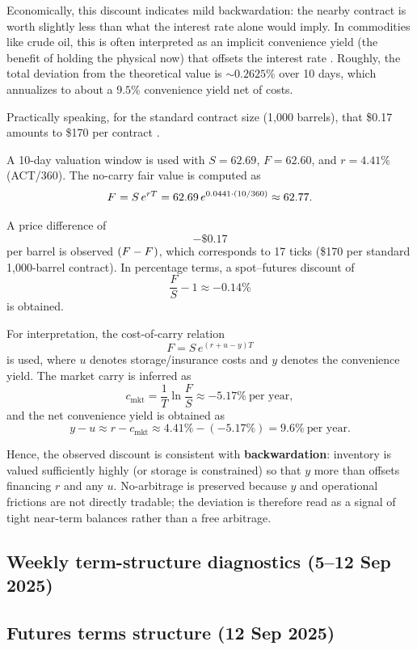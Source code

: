 \documentclass[11pt,a4paper]{article} %
\begin{document}
Economically, this discount indicates mild backwardation: the nearby contract is worth slightly less than what the interest rate alone would imply. In commodities like crude oil, this is often interpreted as an implicit convenience yield (the benefit of holding the physical now) that offsets the interest rate \citep{kaldor_working_brennan, eia_backwardation_2013, milonas_convenience_2024}. Roughly, the total deviation from the theoretical value is $\sim 0.2625\%$ over 10 days, which annualizes to about a $9.5\%$ convenience yield net of costs.

Practically speaking, for the standard contract size (1{,}000 barrels), that \$0.17 amounts to \$170 per contract \citep{cme_cl_specs}.


A 10-day valuation window is used with $S=62.69$, $F=62.60$, and $r=4.41\%$ (ACT/360). The no-carry fair value is computed as
\[
F^{\*}=S\,e^{rT}=62.69\,e^{0.0441\cdot(10/360)}\approx62.77.
\]

A price difference of
\[
-\$0.17
\]
per barrel is observed $(F-F^{\*})$, which corresponds to 17 ticks (\$170 per standard 1,000-barrel contract). In percentage terms, a spot–futures discount of
\[
\frac{F}{S}-1 \approx -0.14\%
\]
is obtained.

For interpretation, the cost-of-carry relation
\[
F=S\,e^{(r+u-y)T}
\]
is used, where $u$ denotes storage/insurance costs and $y$ denotes the convenience yield. The market carry is inferred as
\[
c_{\text{mkt}}=\frac{1}{T}\ln\!\frac{F}{S}\approx-5.17\%\ \text{per year},
\]
and the net convenience yield is obtained as
\[
y-u \approx r-c_{\text{mkt}}\approx 4.41\%-(-5.17\%)=9.6\% \ \text{per year}.
\]

Hence, the observed discount is consistent with \textbf{backwardation}: inventory is valued sufficiently highly (or storage is constrained) so that $y$ more than offsets financing $r$ and any $u$. No-arbitrage is preserved because $y$ and operational frictions are not directly tradable; the deviation is therefore read as a signal of tight near-term balances rather than a free arbitrage.

\subsection{Weekly term-structure diagnostics (5–12 Sep 2025)}


\subsection{Futures terms structure (12 Sep 2025)}
\end{document}
